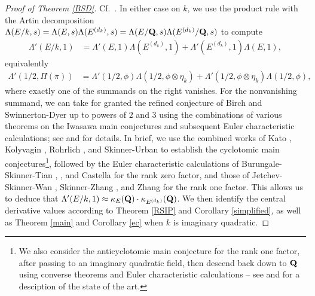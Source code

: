 \documentclass{amsart}
\theoremstyle{definition}
\theoremstyle{definition}
\theoremstyle{definition}
\begin{document}
\begin{proof}[Proof of Theorem \ref{BSD}] Cf.~\cite[Theorem 5.1]{VO}. In either case on $k$, we use the product rule with the Artin decomposition 
$\Lambda(E/k, s) = \Lambda(E,s)\Lambda(E^{(d_k)}, s) = \Lambda(E/{\bf{Q}},s)\Lambda(E^{(d_k)}/{\bf{Q}}, s)$ to compute 
\begin{align*} \Lambda'(E/k, 1) &=  \Lambda'(E, 1)\Lambda(E^{(d_k)}, 1) + \Lambda'(E^{(d_k)},1)\Lambda(E, 1), \end{align*} equivalently 
\begin{align*} \Lambda'(1/2, \Pi(\pi)) &=  \Lambda'(1/2, \phi)\Lambda(1/2, \phi \otimes \eta_k) + \Lambda'(1/2, \phi \otimes \eta_k)\Lambda(1/2, \phi), \end{align*}
where exactly one of the summands on the right vanishes. For the nonvanishing summand, we can take for granted the refined conjecture
of Birch and Swinnerton-Dyer up to powers of $2$ and $3$ using the combinations of various theorems on the Iwasawa main conjectures and subsequent Euler
characteristic calculations; see \cite{BST} and \cite{BST2} for details. In brief, we use the combined works of 
Kato \cite{Ka}, Kolyvagin \cite{Ko}, Rohrlich \cite{Ro}, and Skinner-Urban \cite{SU} to establish the cyclotomic main 
conjectures\footnote{We also consider the anticyclotomic main conjecture for the rank one factor, after passing to an imaginary quadratic field,
then descend back down to ${\bf{Q}}$ using converse theorems and Euler characteristic calculations -- see \cite{BST} and \cite{BST2} for a desciption of
the state of the art.}, followed by the Euler characteristic calculations of Burungale-Skinner-Tian \cite{BST}, \cite{BST2}, 
and Castella \cite{Ca} for the rank zero factor, and those of Jetchev-Skinner-Wan \cite{JSW}, Skinner-Zhang \cite{SkZh}, and Zhang \cite{WZ} 
for the rank one factor. This allows us to deduce that $\Lambda'(E/k, 1) \approx \kappa_E({\bf{Q}}) \cdot \kappa_{E^{(d_k)}}({\bf{Q}})$. 
We then identify the central derivative values according to Theorem \ref{RSIP} and Corollary \ref{simplified}, as well as Theorem \ref{main}
and Corollary \ref{ec} when $k$ is imaginary quadratic. \end{proof}
\end{document}
